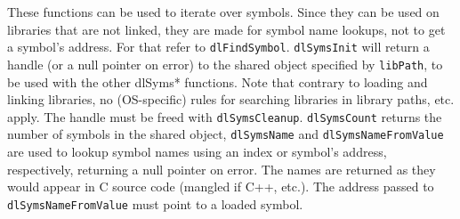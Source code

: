These functions can be used to iterate over symbols. Since they can be used on libraries that are not linked, they are made
for symbol name lookups, not to get a symbol's address. For that refer to
\lstinline{dlFindSymbol}. \lstinline{dlSymsInit} will return a handle (or a null pointer
on error) to the shared object specified by \lstinline{libPath}, to be used with the other dlSyms* functions. Note that contrary
to loading and linking libraries, no (OS-specific) rules for searching libraries in library paths, etc. apply. The handle must be freed with
\lstinline{dlSymsCleanup}. \lstinline{dlSymsCount} returns the number of
symbols in the shared object, \lstinline{dlSymsName} and \lstinline{dlSymsNameFromValue}
are used to lookup symbol names using an index or symbol's address, respectively,
returning a null pointer on error. The names are returned as they would appear
in C source code (mangled if C++, etc.). The address passed to \lstinline{dlSymsNameFromValue}
must point to a loaded symbol.

